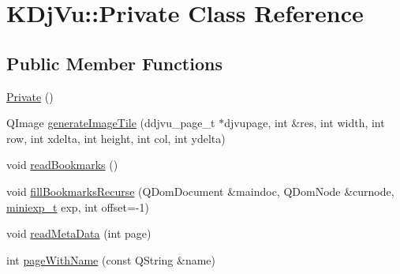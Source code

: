 \hypertarget{classKDjVu_1_1Private}{\section{K\+Dj\+Vu\+:\+:Private Class Reference}
\label{classKDjVu_1_1Private}
}
\subsection*{Public Member Functions}
\begin{DoxyCompactItemize}
\item 
\hyperlink{classKDjVu_1_1Private_aa74c6a57ea120fba54423cf9d2881b07}{Private} ()
\item 
Q\+Image \hyperlink{classKDjVu_1_1Private_aeb06ba931fdafc7b463603fb7481d477}{generate\+Image\+Tile} (ddjvu\+\_\+page\+\_\+t $\ast$djvupage, int \&res, int width, int row, int xdelta, int height, int col, int ydelta)
\item 
void \hyperlink{classKDjVu_1_1Private_a0272321e85183ccde6326dc13a21c2bb}{read\+Bookmarks} ()
\item 
void \hyperlink{classKDjVu_1_1Private_a880323dc9a820151abfbfd5ee2822665}{fill\+Bookmarks\+Recurse} (Q\+Dom\+Document \&maindoc, Q\+Dom\+Node \&curnode, \hyperlink{kdjvu_8h_a58955b1a7edfc6e6ccb48402f744802b}{miniexp\+\_\+t} exp, int offset=-\/1)
\item 
void \hyperlink{classKDjVu_1_1Private_a7b150f97629079f814eeb91368cc3dcc}{read\+Meta\+Data} (int page)
\item 
int \hyperlink{classKDjVu_1_1Private_aaba1afe5cef39023edfae2f4333d2c10}{page\+With\+Name} (const Q\+String \&name)
\end{DoxyCompactItemize}
